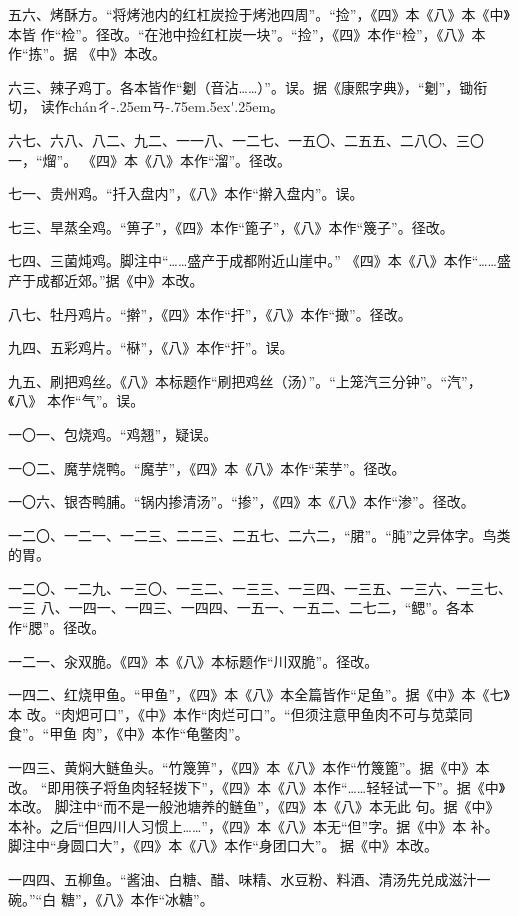 \begin{list}{}
五六、烤酥方。“将烤池内的红杠炭捡于烤池四周”。“捡”，《四》本《八》本《中》本皆
作“检”。径改。“在池中捡红杠炭一块”。“捡”，《四》本作“检”，《八》本作“拣”。据
《中》本改。

六三、辣子鸡丁。各本皆作“劖（音沾……）”。误。据《康熙字典》，“劖”，锄衔切，
读作{ch\'{a}n}{ㄔ\kern-.25emㄢ\kern-.75em\raise.5ex\hbox{\'{}}\kern.25em}。

六七、六八、八二、九二、一一八、一二七、一五〇、二五五、二八〇、三〇一，“熘”。
《四》本《八》本作“溜”。径改。

七一、贵州鸡。“扦入盘内”，《八》本作“擀入盘内”。误。

七三、旱蒸全鸡。“箅子”，《四》本作“篦子”，《八》本作“篾子”。径改。

七四、三菌炖鸡。脚注{\footnotesize{}}中“……盛产于成都附近山崖中。”
《四》本《八》本作“……盛产于成都近郊。”据《中》本改。

八七、牡丹鸡片。“擀”，《四》本作“扞”，《八》本作“撖”。径改。

九四、五彩鸡片。“㮟”，《八》本作“扞”。误。

九五、刷把鸡丝。《八》本标题作“刷把鸡丝（汤）”。“上笼汽三分钟”。“汽”，《八》
本作“气”。误。

一〇一、包烧鸡。“鸡翘”，疑误。

一〇二、魔芋烧鸭。“魔芋”，《四》本《八》本作“茉芋”。径改。

一〇六、银杏鸭脯。“锅内掺清汤”。“掺”，《四》本《八》本作“渗”。径改。

一二〇、一二一、一二三、二二三、二五七、二六二，“𬂁”。“肫”之异体字。鸟类的胃。

一二〇、一二九、一三〇、一三二、一三三、一三四、一三五、一三六、一三七、一三
八、一四一、一四三、一四四、一五一、一五二、二七二，“鳃”。各本作“腮”。径改。

一二一、汆双脆。《四》本《八》本标题作“川双脆”。径改。

一四二、红烧甲鱼。“甲鱼”，《四》本《八》本全篇皆作“足鱼”。据《中》本《七》本
改。“肉𤆵可口”，《中》本作“肉烂可口”。“但须注意甲鱼肉不可与苋菜同食”。“甲鱼
肉”，《中》本作“龟鳖肉”。

一四三、黄焖大鲢鱼头。“竹篾箅”，《四》本《八》本作“竹篾篦”。据《中》本改。
“即用筷子将鱼肉轻轻拨下”，《四》本《八》本作“……轻轻试一下”。据《中》本改。
脚注{\footnotesize{}}中“而不是一般池塘养的鲢鱼”，《四》本《八》本无此
句。据《中》本补。之后“但四川人习惯上……”，《四》本《八》本无“但”字。据《中》本
补。脚注{\footnotesize{}}中“身圆口大”，《四》本《八》本作“身团口大”。
据《中》本改。

一四四、五柳鱼。“酱油、白糖、醋、味精、水豆粉、料酒、清汤先兑成滋汁一碗。”“白
糖”，《八》本作“冰糖”。


\end{list}
